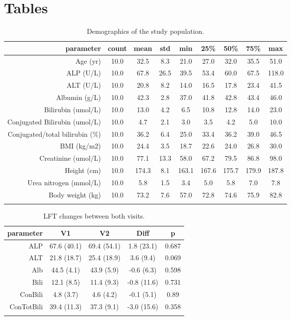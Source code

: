 \documentclass{epflreport}%
\begin{document}
\chapter{Tables}%
\begin{longtable}{rcccccccc}%
\hline%
parameter&count&mean&std&min&25\%&50\%&75\%&max\\%
\hline%
Age (yr)&10.0&32.5&8.3&21.0&27.0&32.0&35.5&51.0\\%
ALP (U/L)&10.0&67.8&26.5&39.5&53.4&60.0&67.5&118.0\\%
ALT (U/L)&10.0&20.8&8.2&14.0&16.5&17.8&23.4&41.5\\%
Albumin (g/L)&10.0&42.3&2.8&37.0&41.8&42.8&43.4&46.0\\%
Bilirubin (umol/L)&10.0&13.0&4.2&6.5&10.8&12.8&14.0&23.0\\%
Conjugated Bilirubin (umol/L)&10.0&4.7&2.1&3.0&3.5&4.2&5.0&10.0\\%
Conjugated/total bilirubin (\%)&10.0&36.2&6.4&25.0&33.4&36.2&39.0&46.5\\%
BMI  (kg/m2)&10.0&24.4&3.5&18.7&22.6&24.0&26.8&30.0\\%
Creatinine (umol/L)&10.0&77.1&13.3&58.0&67.2&79.5&86.8&98.0\\%
Height  (cm)&10.0&174.3&8.1&163.1&167.6&175.7&179.9&187.8\\%
Urea nitrogen (mmol/L)&10.0&5.8&1.5&3.4&5.0&5.8&7.0&7.8\\%
Body weight  (kg)&10.0&73.2&7.6&57.0&72.8&74.6&75.9&82.8\\%
\hline%
\caption{Demographics of the study population.} \\%
\end{longtable}%
\clearpage%
\begin{longtable}{rcccc}%
\hline%
parameter&V1&V2&Diff&p\\%
\hline%
ALP&67.6 (40.1)&69.4 (54.1)&1.8 (23.1)&0.687\\%
ALT&21.8 (18.7)&25.4 (18.9)&3.6 (9.4)&0.069\\%
Alb&44.5 (4.1)&43.9 (5.9)&{-}0.6 (6.3)&0.598\\%
Bili&12.1 (8.5)&11.4 (9.3)&{-}0.8 (11.6)&0.731\\%
ConBili&4.8 (3.7)&4.6 (4.2)&{-}0.1 (5.1)&0.89\\%
ConTotBili&39.4 (11.3)&37.3 (9.1)&{-}3.0 (15.6)&0.358\\%
\hline%
\caption{LFT changes between both visits.} \\%
\end{longtable}%
\clearpage%
\end{document}
